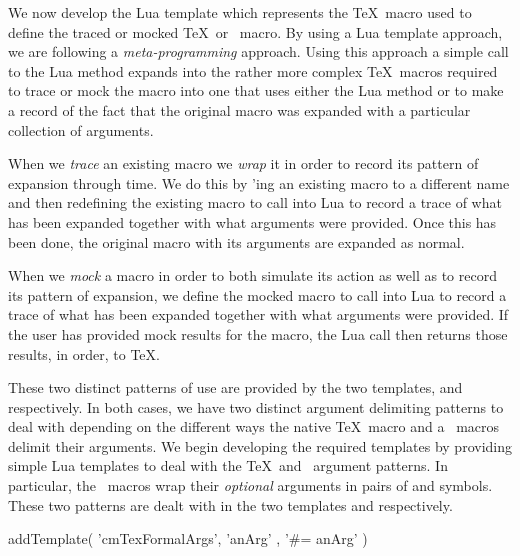 \def\mockTexMacro#1#2{%
  \directlua{%
    thirddata.contests.createMacro('#1', #2, 'tex', 'mock')
  }
}

\def\mockContextMacro#1#2{%
  \directlua{%
    thirddata.contests.createMacro('#1', #2, 'context', 'mock')
  }
}
\stopMkIVCode

We now develop the Lua template which represents the \TeX\ macro used to 
define the traced or mocked \TeX\ or \ConTeXt\ macro. By using a Lua 
template approach, we are following a \emph{meta-programming} approach. 
Using this approach a simple call to the Lua method  
expands into the rather more complex \TeX\ macros required to trace or 
mock the macro into one that uses either the Lua method 
 or  to make a record of the 
fact that the original macro was expanded with a particular collection of 
arguments. 

When we \emph{trace} an existing macro we \emph{wrap} it in order to 
record its pattern of expansion through time. We do this by 
\type{\let}'ing an existing macro to a different name and then redefining 
the existing macro to call into Lua to record a trace of what has been 
expanded together with what arguments were provided. Once this has been 
done, the original macro with its arguments are expanded as normal. 

When we \emph{mock} a macro in order to both simulate its action as well 
as to record its pattern of expansion, we define the mocked macro to call 
into Lua to record a trace of what has been expanded together with what 
arguments were provided. If the user has provided mock results for the 
macro, the Lua call then returns those results, in order, to \TeX. 

These two distinct patterns of use are provided by the two templates, 
 and  respectively. In both cases, we have two 
distinct argument delimiting patterns to deal with depending on the 
different ways the  native \TeX\ macro and a 
 \ConTeXt\ macros delimit their arguments. We begin 
developing the required templates by providing simple Lua templates to 
deal with the \TeX\ and \ConTeXt\ argument patterns. In particular, the 
 \ConTeXt\ macros wrap their \emph{optional} arguments in 
pairs of \quote{[} and \quote{]} symbols. These two patterns are dealt 
with in the two templates  and 
 respectively. 

\startLuaTemplate
addTemplate(
  'cmTexFormalArgs',
  { 'anArg' },
  '#{{= anArg}}'
)


